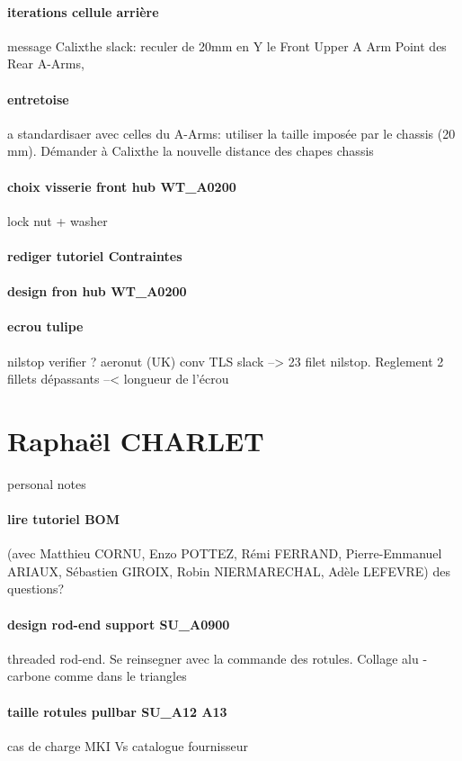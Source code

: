 \paragraph{iterations cellule arrière} message Calixthe slack: reculer de 20mm en Y le Front Upper A Arm Point  des Rear A-Arms,
\paragraph{entretoise}  a standardisaer avec celles du A-Arms: utiliser la taille imposée par le chassis (20 mm). Démander à Calixthe la nouvelle distance des chapes chassis 
\paragraph{choix visserie front hub WT\_A0200} lock nut + washer 
\paragraph{rediger tutoriel Contraintes} 
\paragraph{design fron hub WT\_A0200} 
\paragraph{ecrou tulipe} nilstop verifier ? aeronut (UK) conv TLS slack --> 23 filet nilstop. Reglement 2 fillets dépassants --< longueur de l'écrou

 
 \newpage \section*{Raphaël CHARLET} 
 \par personal notes
\paragraph{lire tutoriel BOM} (avec Matthieu CORNU, Enzo POTTEZ, Rémi FERRAND, Pierre-Emmanuel ARIAUX, Sébastien GIROIX, Robin NIERMARECHAL, Adèle LEFEVRE) des questions?
\paragraph{design rod-end support SU\_A0900} threaded rod-end. Se reinsegner avec la commande des rotules. Collage alu - carbone comme dans le triangles
\paragraph{taille rotules pullbar SU\_A12 A13} cas de charge MKI Vs catalogue fournisseur
